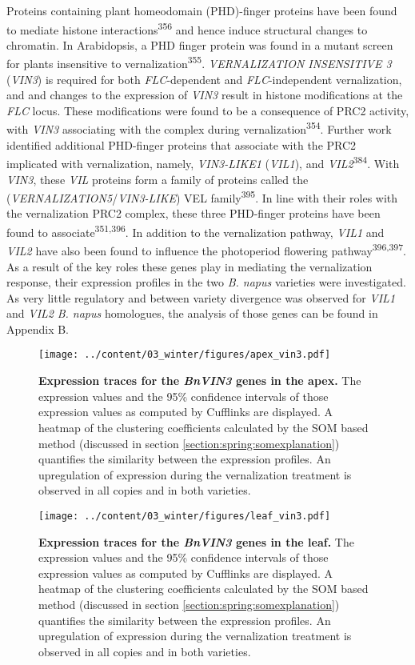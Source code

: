 \documentclass[12pt,]{book}
\begin{document}
Proteins containing plant homeodomain (PHD)-finger proteins have been
found to mediate histone interactions\textsuperscript{356} and hence
induce structural changes to chromatin. In Arabidopsis, a PHD finger
protein was found in a mutant screen for plants insensitive to
vernalization\textsuperscript{355}. \emph{VERNALIZATION INSENSITIVE 3}
(\emph{VIN3}) is required for both \emph{FLC}-dependent and
\emph{FLC}-independent vernalization, and and changes to the expression
of \emph{VIN3} result in histone modifications at the \emph{FLC} locus.
These modifications were found to be a consequence of PRC2 activity,
with \emph{VIN3} associating with the complex during
vernalization\textsuperscript{354}. Further work identified additional
PHD-finger proteins that associate with the PRC2 implicated with
vernalization, namely, \emph{VIN3-LIKE1} (\emph{VIL1}), and
\emph{VIL2}\textsuperscript{384}. With \emph{VIN3}, these \emph{VIL}
proteins form a family of proteins called the
(\emph{VERNALIZATION5}/\emph{VIN3-LIKE}) VEL
family\textsuperscript{395}. In line with their roles with the
vernalization PRC2 complex, these three PHD-finger proteins have been
found to associate\textsuperscript{351,396}. In addition to the
vernalization pathway, \emph{VIL1} and \emph{VIL2} have also been found
to influence the photoperiod flowering pathway\textsuperscript{396,397}.
As a result of the key roles these genes play in mediating the
vernalization response, their expression profiles in the two \emph{B.
napus} varieties were investigated. As very little regulatory and
between variety divergence was observed for \emph{VIL1} and \emph{VIL2}
\emph{B. napus} homologues, the analysis of those genes can be found in
Appendix B.

\begin{figure}[htbp]
\centering
\texttt{[image: ../content/03\_winter/figures/apex\_vin3.pdf]}
\caption{\textbf{Expression traces for the \emph{BnVIN3} genes in the
apex.} The expression values and the 95\% confidence intervals of those
expression values as computed by Cufflinks are displayed. A heatmap of
the clustering coefficients calculated by the SOM based method
(discussed in section \ref{section:spring:somexplanation}) quantifies
the similarity between the expression profiles. An upregulation of
expression during the vernalization treatment is observed in all copies
and in both varieties.}\label{figure:3xx:vin3apex}
\end{figure}

\begin{figure}[htbp]
\centering
\texttt{[image: ../content/03\_winter/figures/leaf\_vin3.pdf]}
\caption{\textbf{Expression traces for the \emph{BnVIN3} genes in the
leaf.} The expression values and the 95\% confidence intervals of those
expression values as computed by Cufflinks are displayed. A heatmap of
the clustering coefficients calculated by the SOM based method
(discussed in section \ref{section:spring:somexplanation}) quantifies
the similarity between the expression profiles. An upregulation of
expression during the vernalization treatment is observed in all copies
and in both varieties.}\label{figure:3xx:vin3leaf}
\end{figure}
\end{document}
